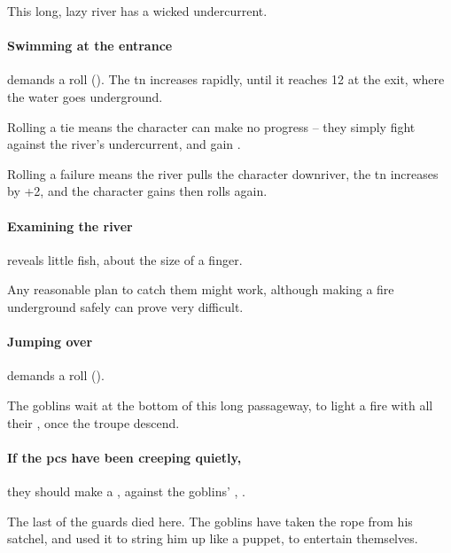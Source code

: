 \begin{multicols}{2}

This long, lazy river has a wicked undercurrent.

\paragraph{Swimming at the entrance}
demands a  roll (\tn[5]).
The \gls{tn} increases rapidly, until it reaches 12 at the exit, where the water goes underground.

Rolling a tie means the character can make no progress -- they simply fight against the river's undercurrent, and gain .

Rolling a failure means the river pulls the character downriver, the \gls{tn} increases by +2, and the character gains  then rolls again.

\paragraph{Examining the river}
reveals little fish, about the size of a finger.

Any reasonable plan to catch them might work, although making a fire underground safely can prove very difficult.%

\paragraph{Jumping over}
demands a  roll (\tn[12]).


The goblins wait at the bottom of this long passageway, to light a fire with all their \fireFuel, once the troupe descend.




\paragraph{If the \glspl{pc} have been creeping quietly,}
they should make a , against the goblins' , \tn.


\begin{exampletext}
  The last of the \glspl{guard} died here.
  The goblins have taken the rope from his satchel, and used it to string him up like a puppet, to entertain themselves.
\end{exampletext}


\end{multicols}
